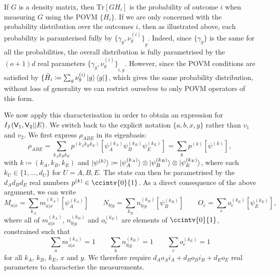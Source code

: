 \documentclass[10pt, a4paper]{article}
\numberwithin{equation}{section} %
\theoremstyle{definition}
\theoremstyle{plain}
\newcommand{\dintv}[2]{\mathopen\{#1,\ldots,#2\mathclose\}}
\newcommand{\?}{\mathrel{?}} %
\newcommand{\Tr}{\mathrm{Tr}} %
\newcommand{\crv}[1]{\mathsf{#1}}
\newcommand{\proj}[2][]{{[#2]}_{#1}}
\begin{document}
    If \(G\) is a density matrix, then \(\Tr[GH_i]\) is the probability of outcome \(i\) when measuring \(G\) using the POVM \(\{H_i\}\). If we are only concerned with the probability distribution over the outcomes \(i\), then as illustrated above, each probability is paramterised fully by \({\{\gamma_g, \nu_{g}^{(i)}\}}_{g}\). Indeed, since \(\{\gamma_g\}\) is the same for all the probabilities, the overall distribution is fully parametrised by the \((o+1)d\) real parameters \({\{\gamma_g, \nu_{g}^{(i)}\}}_{i,g}\). However, since the POVM conditions are satisfied by \(\{\tilde{H}_i \coloneqq \sum_g \nu_g^{(i)} \ket{g}\bra{g}\}\), which gives the same probability distribution, without loss of generality we can restrict ourselves to only POVM operators of this form.

    We now apply this characterisation in order to obtain an expression for \(\splitkey{\crv{V}_1, \crv{V}_2}{E}\). We switch back to the explicit notation \(\{a, b, x, y\}\) rather than \(v_1\) and \(v_2\). We first express \(\rho_{ABE}\) in its eigenbasis:
    \begin{equation}
      \rho_{ABE} = \sum_{k_A k_B k_E} p^{(k_A k_B k_E)} \proj{\psi_A^{(k_A)} \psi_B^{(k_B)} \psi_E^{(k_E)}} = \sum_{k} p^{(k)} \proj{\psi^{(k)}},
    \end{equation}
    with \(k \coloneqq (k_A, k_B, k_E)\) and \(\ket{\psi^{(k)}} \coloneqq \ket{\psi_A^{(k_A)}} \otimes \ket{\psi_B^{(k_B)}} \otimes \ket{\psi_E^{(k_E)}}\), where each \(k_U \in \dintv{1}{d_U}\) for \(U = A,B,E\). The state can then be parametrised by the \(d_A d_B d_E\) real numbers \(p^{(k)} \in \ccintv{0}{1}\). As a direct consequence of the above argument, we can write
    \begin{equation}
      M_{a|x} = \sum_{k_A} m_{a|x}^{(k_A)} \proj{\psi_A^{(k_A)}} \qquad N_{b|y} = \sum_{k_B} n_{b|y}^{(k_B)} \proj{\psi_B^{(k_B)}} \qquad O_{e} = \sum_{e} o_{e}^{(k_E)} \proj{\psi_E^{(k_E)}},
    \end{equation}
    where all of \(m_{a|x}^{(k_A)}\), \(n_{b|y}^{(k_B)}\) and \(o_{e}^{(k_E)}\) are elements of \(\ccintv{0}{1}\), constrained such that
    \begin{equation}
      \sum_{a} m_{a|x}^{(k_A)} = 1 \qquad \sum_{b} n_{b|y}^{(k_B)} = 1 \qquad \sum_{e} o_e^{(k_E)} = 1
    \end{equation}
    for all \(k_A\), \(k_B\), \(k_E\), \(x\) and \(y\). We therefore require \(d_A o_A i_A + d_B o_B i_B + d_E o_E\) real parameters to characterise the measurements.
\end{document}

